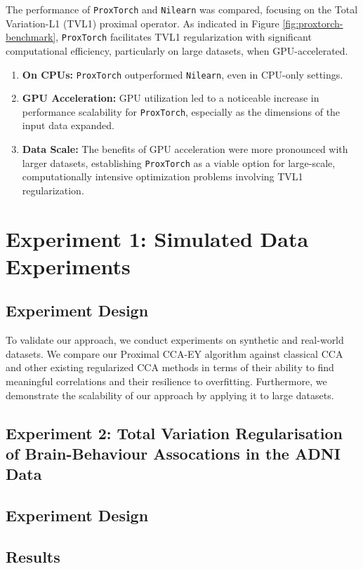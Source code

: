 The performance of \texttt{ProxTorch} and \texttt{Nilearn} was compared, focusing on the Total Variation-L1 (TVL1) proximal operator. As indicated in Figure \ref{fig:proxtorch-benchmark}, \texttt{ProxTorch} facilitates TVL1 regularization with significant computational efficiency, particularly on large datasets, when GPU-accelerated.

\begin{enumerate}
    \item \textbf{On CPUs:} \texttt{ProxTorch} outperformed \texttt{Nilearn}, even in CPU-only settings.
    
    \item \textbf{GPU Acceleration:} GPU utilization led to a noticeable increase in performance scalability for \texttt{ProxTorch}, especially as the dimensions of the input data expanded. 
    
    \item \textbf{Data Scale:} The benefits of GPU acceleration were more pronounced with larger datasets, establishing \texttt{ProxTorch} as a viable option for large-scale, computationally intensive optimization problems involving TVL1 regularization.
\end{enumerate}


\section{Experiment 1: Simulated Data Experiments}
\subsection{Experiment Design}
To validate our approach, we conduct experiments on synthetic and real-world datasets.
We compare our Proximal CCA-EY algorithm against classical CCA and other existing regularized CCA methods in terms of their ability to find meaningful correlations and their resilience to overfitting.
Furthermore, we demonstrate the scalability of our approach by applying it to large datasets.

\subsection{Experiment 2: Total Variation Regularisation of Brain-Behaviour Assocations in the ADNI Data}
\subsection{Experiment Design}
\subsection{Results}

